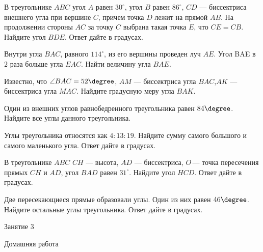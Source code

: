 \begin{class}[number=2]
\begin{listofex}
		\item В треугольнике \( ABC \) угол \( A \) равен \( 30^{\circ} \), угол \( B \) равен \( 86^{\circ} \), \( CD \)  — биссектриса внешнего угла при вершине \( C \), причем точка \( D \) лежит на прямой \( AB \). На продолжении стороны \( AC \) за точку \( C  \) выбрана такая точка \( E \), что \( CE  =  CB \). Найдите угол \( BDE \). Ответ дайте в градусах.
		\item Внутри угла \( BAC \), равного \( 114^{\circ} \), из его вершины проведен луч \( AE \). Угол BAE в \( 2 \) раза больше угла \( EAC \). Найти величину угла \( BAE \). 
	\end{listofex}
\end{class}

\begin{homework}[number=2]
	\begin{listofex}
		\item Известно, что  \( \angle BAC = 52\degree \), \( AM \) — биссектриса угла \( BAC \),\( AK \) — биссектриса угла \(  MAC \). Найдите градусную меру угла \( BAK \).
		\item Один из внешних углов равнобедренного треугольника равен \( 84\degree \). Найдите все углы данного треугольника.
		\item Углы треугольника относятся как \(  4:13:19 \). Найдите сумму самого большого и самого маленького угла. Ответ дайте в градусах.
		\item В треугольнике \( ABC \) \( CH \)  — высота, \( AD \)  —  биссектриса, \( O \) — точка пересечения прямых \( CH \) и \( AD \), угол \( BAD \) равен \( 31^{\circ} \). Найдите угол \( HCD \). Ответ дайте в градусах.
		\item Две пересекающиеся прямые образовали углы. Один из них равен \( 46\degree \). Найдите остальные углы треугольника. Ответ дайте в градусах.
	\end{listofex}
\end{homework}

\begin{class}[number=3]
	\begin{listofex}
		\item Занятие 3
	\end{listofex}
\end{class}

\begin{homework}[number=3]
	\begin{listofex}
		\item Домашняя работа
	\end{listofex}
\end{homework}

